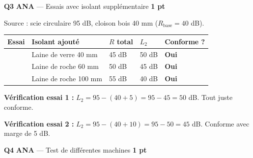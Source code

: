\documentclass[a4paper,11pt]{article}
\newcommand{\pts}[1]{\hfill\textcolor{gris}{\small\textbf{#1}}}
\newcommand{\comp}[1]{\colorbox{blue!10}{\scriptsize\textbf{#1}}}
\begin{document}
\textbf{Q3} \comp{ANA} — Essais avec isolant supplémentaire \pts{1 pt}

\begin{reponsecorr}
Source : scie circulaire 95 dB, cloison bois 40 mm ($R_{\text{base}} = 40$ dB).

\begin{center}
\renewcommand{\arraystretch}{1.5}
\begin{tabular}{|>{\centering\arraybackslash}m{1.2cm}|>{\centering\arraybackslash}m{3.5cm}|>{\centering\arraybackslash}m{2.2cm}|>{\centering\arraybackslash}m{2.2cm}|>{\centering\arraybackslash}m{2.2cm}|}
\hline
\textbf{Essai} & \textbf{Isolant ajouté} & \textbf{$R$ total} & \textbf{$L_2$} & \textbf{Conforme ?} \\
\hline
1 & Laine de verre 40 mm & \textcolor{rouge}{45 dB} & \textcolor{rouge}{50 dB} & \textcolor{vertpro}{\textbf{Oui}} \\
\hline
2 & Laine de roche 60 mm & \textcolor{rouge}{50 dB} & \textcolor{rouge}{45 dB} & \textcolor{vertpro}{\textbf{Oui}} \\
\hline
3 & Laine de roche 100 mm & \textcolor{rouge}{55 dB} & \textcolor{rouge}{40 dB} & \textcolor{vertpro}{\textbf{Oui}} \\
\hline
\end{tabular}
\renewcommand{\arraystretch}{1}
\end{center}

\smallskip
\textbf{Vérification essai 1 :} $L_2 = 95 - (40+5) = 95 - 45 = 50$ dB. Tout juste conforme.

\textbf{Vérification essai 2 :} $L_2 = 95 - (40+10) = 95 - 50 = 45$ dB. Conforme avec marge de 5 dB.
\end{reponsecorr}

\textbf{Q4} \comp{ANA} — Test de différentes machines \pts{1 pt}
\end{document}
